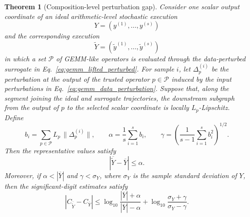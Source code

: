 \documentclass[10pt,a4paper]{amsart}
\newtheorem{theorem}{Theorem}
\begin{document}
\begin{theorem}[Composition-level perturbation gap]
\label{thm:composition_perturbation_gap}
Consider one scalar output coordinate of an ideal arithmetic-level stochastic
execution
\[
Y=(y^{(1)},\ldots,y^{(s)})
\]
and the corresponding execution
\[
\widetilde{Y}=(\widetilde{y}^{(1)},\ldots,\widetilde{y}^{(s)})
\]
in which a set $\mathcal{P}$ of GEMM-like operators is evaluated through the
data-perturbed surrogate in Eq.~\eqref{eq:gemm_lifted_perturbed}. For sample
$i$, let $\Delta_p^{(i)}$ be the perturbation at the output of the trusted
operator $p\in\mathcal{P}$ induced by the input perturbations in
Eq.~\eqref{eq:gemm_data_perturbation}. Suppose that, along the segment joining
the ideal and surrogate trajectories, the downstream subgraph from the output
of $p$ to the selected scalar coordinate is locally $L_p$-Lipschitz. Define
\begin{equation}
b_i =
\sum_{p\in\mathcal{P}} L_p\,\|\Delta_p^{(i)}\|,
\qquad
\alpha=\frac{1}{s}\sum_{i=1}^{s}b_i,
\qquad
\gamma=
\left(\frac{1}{s-1}\sum_{i=1}^{s}b_i^2\right)^{1/2}.
\label{eq:composition_gap_terms}
\end{equation}
Then the representative values satisfy
\begin{equation}
\left|
\overline{\widetilde{Y}}-\overline{Y}
\right|
\le \alpha.
\label{eq:representative_gap_bound}
\end{equation}
Moreover, if $\alpha<|\overline{Y}|$ and $\gamma<\sigma_Y$, where
$\sigma_Y$ is the sample standard deviation of $Y$, then the significant-digit
estimates satisfy
\begin{equation}
\left|
C_{\overline{\widetilde{Y}}}
-
C_{\overline{Y}}
\right|
\le
\log_{10}
\frac{|\overline{Y}|+\alpha}
     {|\overline{Y}|-\alpha}
+
\log_{10}
\frac{\sigma_Y+\gamma}
     {\sigma_Y-\gamma}.
\label{eq:composition_digit_gap_bound}
\end{equation}
\end{theorem}
\end{document}
